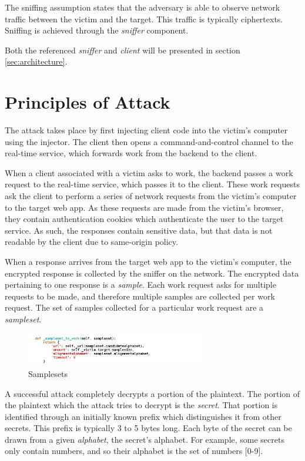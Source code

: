 The sniffing assumption states that the adversary is able to observe network
traffic between the victim and the target. This traffic is typically
ciphertexts. Sniffing is achieved through the \textit{sniffer} component.

Both the referenced \textit{sniffer} and \textit{client} will be presented in section 
\ref{sec:architecture}.



\section{Principles of Attack}\label{sec:principles}


The attack takes place by first injecting client code into the victim's
computer using the injector. The client then opens a command-and-control
channel to the real-time service, which forwards work from the backend to the
client.

When a client associated with a victim asks to work, the backend passes a work
request to the real-time service, which passes it to the client. These work
requests ask the client to perform a series of network requests from the
victim's computer to the target web app. As these requests are made from the
victim's browser, they contain authentication cookies which authenticate the
user to the target service. As such, the responses contain sensitive data, but
that data is not readable by the client due to same-origin policy.

When a response arrives from the target web app to the victim's computer, the
encrypted response is collected by the sniffer on the network. The encrypted
data pertaining to one response is a \textit{sample}. Each work request asks for
multiple requests to be made, and therefore multiple samples are collected per
work request. The set of samples collected for a particular work request are a
\textit{sampleset}.


\begin{figure}[H] \caption{Samplesets} \centering
\includegraphics[width=0.7\textwidth]{diagrams/samplesets.png}\end{figure}

A successful attack completely decrypts a portion of the plaintext. The portion
of the plaintext which the attack tries to decrypt is the \textit{secret}. That
portion is identified through an initially known prefix which distinguishes it
from other secrets. This prefix is typically 3 to 5 bytes long. Each byte of
the secret can be drawn from a given \textit{alphabet}, the secret's alphabet. For
example, some secrets only contain numbers, and so their alphabet is the set of
numbers [0-9].

